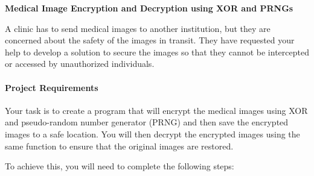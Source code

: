 \question
{\center \bf Medical Image Encryption and Decryption using XOR and PRNGs\\}

A clinic has to send medical images to another institution, but they are
concerned about the safety of the images in transit. They have requested
your help to develop a solution to secure the images so that they cannot
be intercepted or accessed by unauthorized individuals.

\hypertarget{project-requirements}{%
\paragraph{Project Requirements}\label{project-requirements}}

Your task is to create a program that will encrypt the medical images
using XOR and pseudo-random number generator (PRNG) and then save the encrypted images to a safe
location. You will then decrypt the encrypted images using the same
function to ensure that the original images are restored.

To achieve this, you will need to complete the following steps:


